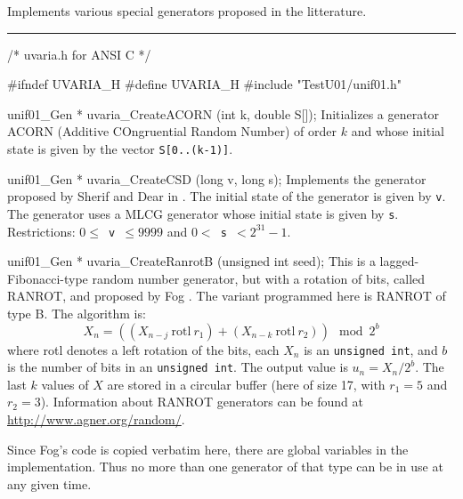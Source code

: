 
Implements various special generators proposed in the litterature.


\bigskip
\hrule
\code
\hide
/* uvaria.h for ANSI C */

#ifndef UVARIA_H
#define UVARIA_H
\endhide
#include "TestU01/unif01.h"


unif01_Gen * uvaria_CreateACORN (int k, double S[]);
\endcode
  \tab  Initializes a generator ACORN (Additive COngruential Random Number)
  \cite{rWIK89a} of order $k$ and
%
   whose initial state is given by the vector {\tt S[0..(k-1)]}.
  \endtab
\code


unif01_Gen * uvaria_CreateCSD (long v, long s);
\endcode
  \tab Implements the generator proposed by Sherif and
%
   Dear in \cite{rSHE90a}.  The initial state of the generator is given
   by {\tt v}.  The generator uses a  MLCG generator whose
   initial state is given by {\tt s}.  Restrictions:
   {\tt $0 \le$ v $\le 9999$} and {\tt $0 <$ s $< 2^{31}-1$}.
  \endtab
\code


unif01_Gen * uvaria_CreateRanrotB (unsigned int seed);
\endcode
  \tab
  This is a lagged-Fibonacci-type random number generator, but
%
  with a rotation of bits, called RANROT, and proposed by 
  Fog \cite{rFOG01a}.  The variant programmed here is RANROT of type B.
  The algorithm is:
  $$
    X_n = \left((X_{n-j}\ \mbox{rotl}\  r_1) +
          (X_{n-k}\  \mbox{rotl}\  r_2)\right) \mod 2^b
  $$
  where rotl denotes a left rotation of the bits,
  each $X_n$ is an {\tt unsigned int}, 
  and $b$ is the number of bits in an {\tt unsigned int}. 
  The output value is $u_n = X_n/2^b$.
  The last $k$ values of $X$ are stored in a circular buffer 
  (here of size 17, with $r_1 = 5$ and $r_2 = 3$).
  Information about RANROT generators can be found at 
  \url{http://www.agner.org/random/}.

  Since Fog's code is copied verbatim here, there are global
  variables in the implementation. Thus no more than
  one generator of that type can be in use at any given time. 
 \endtab
\code


